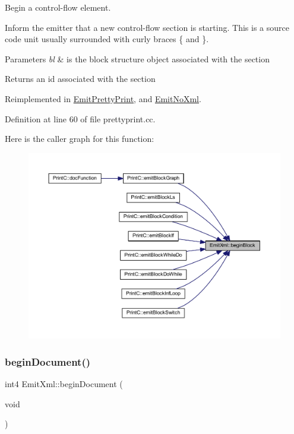 Begin a control-\/flow element. 

Inform the emitter that a new control-\/flow section is starting. This is a source code unit usually surrounded with curly braces \textquotesingle{}\{\textquotesingle{} and \textquotesingle{}\}\textquotesingle{}. 
\begin{DoxyParams}{Parameters}
{\em bl} & is the block structure object associated with the section \\
\hline
\end{DoxyParams}
\begin{DoxyReturn}{Returns}
an id associated with the section 
\end{DoxyReturn}


Reimplemented in \mbox{\hyperlink{class_emit_pretty_print_a751c7bb68c0557dc40cc2b1a2cb5a85f}{Emit\+Pretty\+Print}}, and \mbox{\hyperlink{class_emit_no_xml_ab2c5370c53fdbba7630f10249d933355}{Emit\+No\+Xml}}.



Definition at line 60 of file prettyprint.\+cc.

Here is the caller graph for this function\+:
\nopagebreak
\begin{figure}[H]
\begin{center}
\leavevmode
\includegraphics[width=350pt]{class_emit_xml_ad6cc09d4dfde00428eae8d556cd0fe72_icgraph}
\end{center}
\end{figure}
\mbox{\label{class_emit_xml_a9a4891144e0743f2b10faa32e6d34181}} 
\subsubsection{\texorpdfstring{beginDocument()}{beginDocument()}}
{\footnotesize\ttfamily int4 Emit\+Xml\+::begin\+Document (\begin{DoxyParamCaption}\item[{void}]{ }\end{DoxyParamCaption})\hspace{0.3cm}{\ttfamily [virtual]}}



